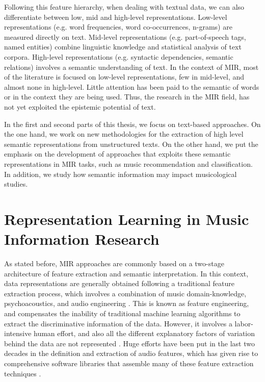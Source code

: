 Following this feature hierarchy, when dealing with textual data, we can also differentiate between low, mid and high-level representations. Low-level representations (e.g. word frequencies, word co-occurrences, n-grams) are measured directly on text. Mid-level representations (e.g. part-of-speech tags, named entities) combine linguistic knowledge and statistical analysis of text corpora. High-level representations (e.g. syntactic dependencies, semantic relations) involves a semantic understanding of text. In the context of MIR, most of the literature is focused on low-level representations, few in mid-level, and almost none in high-level. Little attention has been paid to the semantic of words or in the context they are being used. Thus, the research in the MIR field, has not yet exploited the epistemic potential of text.

In the first and second parts of this thesis, we focus on text-based approaches. On the one hand, we work on new methodologies for the extraction of high level semantic representations from unstructured texts. On the other hand, we put the emphasis on the development of approaches that exploits these semantic representations in MIR tasks, such as music recommendation and classification. In addition, we study how semantic information may impact musicological studies.

\section{Representation Learning in Music Information Research}
\label{sec:intro:learning}

As stated before, MIR approaches are commonly based on a two-stage architecture of feature extraction and semantic interpretation. In this context, data representations are generally obtained following a traditional feature extraction process, which involves a combination of music domain-knowledge, psychoacoustics, and audio engineering \citep{humphrey2012}. 
This is known as feature engineering, and compensates the inability of traditional machine learning algorithms to extract the discriminative information of the data. However, it involves a labor-intensive human effort, and also all the different explanatory factors of variation behind the data are not represented \citep{bengio2013representation}. 
Huge efforts have been put in the last two decades in the definition and extraction of audio features, which has given rise to comprehensive software libraries that assemble many of these feature extraction techniques \citep{bogdanov2013essentia, Mcfee2015}. 

